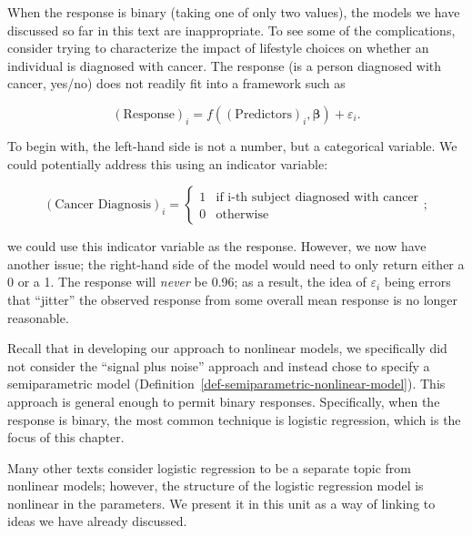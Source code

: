 \documentclass[
  letterpaper,
  DIV=11,
  numbers=noendperiod]{scrreprt}
\theoremstyle{definition}
\theoremstyle{definition}
\theoremstyle{remark}
\begin{document}
When the response is binary (taking one of only two values), the models
we have discussed so far in this text are inappropriate. To see some of
the complications, consider trying to characterize the impact of
lifestyle choices on whether an individual is diagnosed with cancer. The
response (is a person diagnosed with cancer, yes/no) does not readily
fit into a framework such as

\[(\text{Response})_i = f\left((\text{Predictors})_i, \boldsymbol{\beta}\right) + \varepsilon_i.\]

To begin with, the left-hand side is not a number, but a categorical
variable. We could potentially address this using an indicator variable:

\[(\text{Cancer Diagnosis})_i = \begin{cases} 1 & \text{if i-th subject diagnosed with cancer} \\ 0 & \text{otherwise} \end{cases};\]

we could use this indicator variable as the response. However, we now
have another issue; the right-hand side of the model would need to only
return either a 0 or a 1. The response will \emph{never} be 0.96; as a
result, the idea of \(\varepsilon_i\) being errors that ``jitter'' the
observed response from some overall mean response is no longer
reasonable.

Recall that in developing our approach to nonlinear models, we
specifically did not consider the ``signal plus noise'' approach and
instead chose to specify a semiparametric model
(Definition~\ref{def-semiparametric-nonlinear-model}). This approach is
general enough to permit binary responses. Specifically, when the
response is binary, the most common technique is logistic regression,
which is the focus of this chapter.

\begin{tcolorbox}[enhanced jigsaw, left=2mm, toprule=.15mm, arc=.35mm, breakable, opacitybacktitle=0.6, opacityback=0, rightrule=.15mm, colbacktitle=quarto-callout-note-color!10!white, coltitle=black, leftrule=.75mm, toptitle=1mm, colframe=quarto-callout-note-color-frame, titlerule=0mm, title=\textcolor{quarto-callout-note-color}{\faInfo}\hspace{0.5em}{Note}, bottomrule=.15mm, colback=white, bottomtitle=1mm]

Many other texts consider logistic regression to be a separate topic
from nonlinear models; however, the structure of the logistic regression
model is nonlinear in the parameters. We present it in this unit as a
way of linking to ideas we have already discussed.

\end{tcolorbox}
\end{document}
